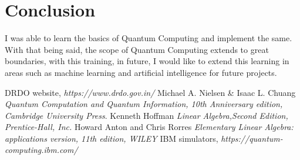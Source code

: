 \documentclass[12pt]{report}
\begin{document}
\begin{appendices}








\end{appendices}

\chapter*{Conclusion}
I was able to learn the basics of Quantum Computing and implement the same. With that being said, the scope of Quantum Computing extends to great boundaries, with this training, in future, I would like to extend this learning in areas such as machine learning and artificial intelligence for future projects.
\begin{thebibliography}{9}
 DRDO website,
\textit{https://www.drdo.gov.in/}
Michael A. Nielsen \& Isaac L. Chuang 
\textit{Quantum Computation and Quantum Information, 10th Anniversary edition, Cambridge University Press}. 
Kenneth Hoffman 
\textit{Linear Algebra,Second Edition, Prentice-Hall, Inc.}
Howard Anton and Chris Rorres
\textit{Elementary Linear Algebra: applications version, 11th edition, WILEY}
IBM simulators,
\textit{https://quantum-computing.ibm.com/}
\end{thebibliography}
\end{document}
